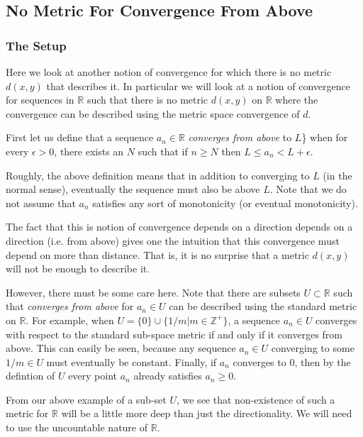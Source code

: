 \subsection{No Metric For Convergence From Above}
\subsubsection*{The Setup}

Here we look at another notion of convergence for which there is no metric \(d(x, y)\) that describes it.
In particular we will look at a notion of convergence for sequences in \(\mathbb R\) such that there is
no metric \(d(x, y)\) on \(\mathbb R\) 
where the convergence can be described using the metric space convergence of \(d\).

First let us define that a sequence \(a_n \in \mathbb R\) \textit{converges from above} to \(L\)\} when 
for every \(\epsilon > 0\), there exists an \(N\) such that if \(n\geq N\) then \(L \leq a_n < L + \epsilon\).

Roughly, the above definition means that in addition to converging to \(L\) (in the normal sense), 
eventually the sequence must also be above \(L\). Note that we do not assume that \(a_n\) satisfies any sort
of monotonicity (or eventual monotonicity). 

The fact that this is notion of convergence depends on a direction depends on a direction (i.e. from above)
gives one the intuition that this convergence must depend on more than distance. That is, it is no surprise
that a metric \(d(x, y)\) will not be enough to describe it.

However, there must be some care here. Note that there are subsets \(U \subset \mathbb R\) 
such that \textit{converges from above} for \(a_n \in U\)
can be described using the standard metric on \(\mathbb R\). For example, when 
\(U = \{0\} \cup \{1 / m | m \in \mathbb Z^+\}\), a sequence \(a_n \in U\) converges with respect to the
standard sub-space metric if and only if it converges from above. This can easily be seen, because any
sequence \(a_n \in U\) converging to some \(1 / m \in U\) must eventually be constant. Finally, if \(a_n\)
converges to \(0\), then by the defintion of \(U\) every point \(a_n\) already satisfies \(a_n \geq 0\).

From our above example of a sub-set \(U\), we see that non-existence of such a metric for \(\mathbb R\)
will be a little more deep than just the directionality. We will need to use the uncountable nature of
\(\mathbb R\).

